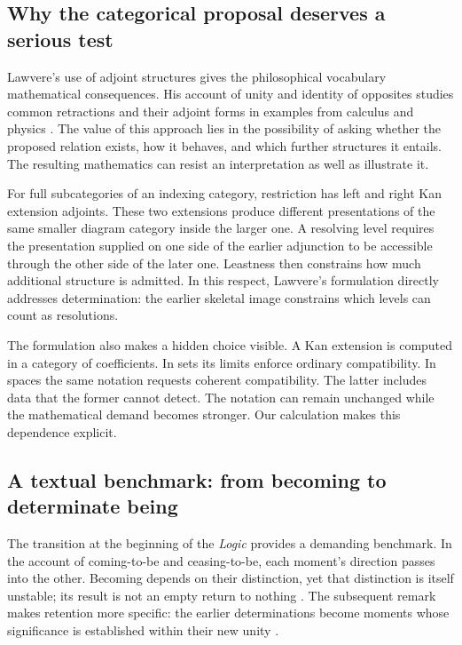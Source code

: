 \subsection{Why the categorical proposal deserves a serious test}

Lawvere's use of adjoint structures gives the philosophical vocabulary
mathematical consequences. His account of unity and identity of opposites
studies common retractions and their adjoint forms in examples from calculus
and physics \cite{Lawvere1996}. The value of this approach lies in the
possibility of asking whether the proposed relation exists, how it behaves,
and which further structures it entails. The resulting mathematics can resist
an interpretation as well as illustrate it.

For full subcategories of an indexing category, restriction has left and right
Kan extension adjoints. These two extensions produce different presentations
of the same smaller diagram category inside the larger one. A resolving level
requires the presentation supplied on one side of the earlier adjunction to
be accessible through the other side of the later one. Leastness then
constrains how much additional structure is admitted. In this respect,
Lawvere's formulation directly addresses determination: the earlier skeletal
image constrains which levels can count as resolutions.

The formulation also makes a hidden choice visible. A Kan extension is
computed in a category of coefficients. In sets its limits enforce ordinary
compatibility. In spaces the same notation requests coherent compatibility.
The latter includes data that the former cannot detect. The notation can
remain unchanged while the mathematical demand becomes stronger. Our
calculation makes this dependence explicit.

\subsection{A textual benchmark: from becoming to determinate being}

The transition at the beginning of the \emph{Logic} provides a demanding
benchmark. In the account of coming-to-be and ceasing-to-be, each moment's
direction passes into the other. Becoming depends on their distinction,
yet that distinction is itself unstable; its result is not an empty
return to nothing \cite{HegelBecoming}. The subsequent remark makes
retention more specific: the earlier determinations become moments whose
significance is established within their new unity \cite{HegelSublation}.

